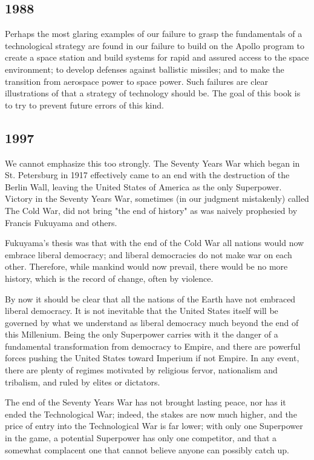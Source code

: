 \subsection{1988}
Perhaps the most glaring examples of our failure to grasp the fundamentals of a technological strategy are found in our failure to build on the Apollo program to create a space station and build systems for rapid and assured access to the space environment; to develop defenses against ballistic missiles; and to make the transition from aerospace power to space power. Such failures are clear illustrations of that a strategy of technology should be. The goal of this book is to try to prevent future errors of this kind.

\subsection{1997}
We cannot emphasize this too strongly. The Seventy Years War which began in St. Petersburg in 1917 effectively came to an end with the destruction of the Berlin Wall, leaving the United States of America as the only Superpower. Victory in the Seventy Years War, sometimes (in our judgment mistakenly) called The Cold War, did not bring "the end of history" as was naively prophesied by Francis Fukuyama and others.

Fukuyama's thesis was that with the end of the Cold War all nations would now embrace liberal democracy; and liberal democracies do not make war on each other. Therefore, while mankind would now prevail, there would be no more history, which is the record of change, often by violence.

By now it should be clear that all the nations of the Earth have not embraced liberal democracy. It is not inevitable that the United States itself will be governed by what we understand as liberal democracy much beyond the end of this Millenium. Being the only Superpower carries with it the danger of a fundamental transformation from democracy to Empire, and there are powerful forces pushing the United States toward Imperium if not Empire. In any event, there are plenty of regimes motivated by religious fervor, nationalism and tribalism, and ruled by elites or dictators.

The end of the Seventy Years War has not brought lasting peace, nor has it ended the Technological War; indeed, the stakes are now much higher, and the price of entry into the Technological War is far lower; with only one Superpower in the game, a potential Superpower has only one competitor, and that a somewhat complacent one that cannot believe anyone can possibly catch up.

